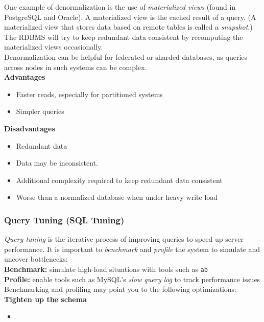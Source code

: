 \documentclass[12pt, titlepage]{article}
\begin{document}
One example of denormalization is the use of \textit{materialized views} (found in PostgreSQL and Oracle). A materialized view is the cached result of a query. (A materialized view that stores data based on remote tables is called a \textit{snapshot}.) The RDBMS will try to keep redundant data consistent by recomputing the materialized views occasionally. \\

Denormalization can be helpful for federated or sharded databases, as queries across nodes in such systems can be complex. \\

\textbf{Advantages}
\begin{itemize}
  \item Faster reads, especially for partitioned systems
  \item Simpler queries \\
\end{itemize}

\textbf{Disadvantages}
\begin{itemize}
  \item Redundant data
  \item Data may be inconsistent.
  \item Additional complexity required to keep redundant data consistent
  \item Worse than a normalized database when under heavy write load
\end{itemize}

\subsubsection{Query Tuning (SQL Tuning)}

\textit{Query tuning} is the iterative process of improving queries to speed up server performance. It is important to \textit{benchmark} and \textit{profile} the system to simulate and uncover bottlenecks: \\

\textbf{Benchmark:} simulate high-load situations with tools such as \texttt{ab} \medskip \\
\textbf{Profile:} enable tools such as MySQL's \textit{slow query log} to track performance issues \\

Benchmarking and profiling may point you to the following optimizations: \\

\textbf{Tighten up the schema}
\begin{itemize}
  \item 
\end{itemize}
\end{document}
